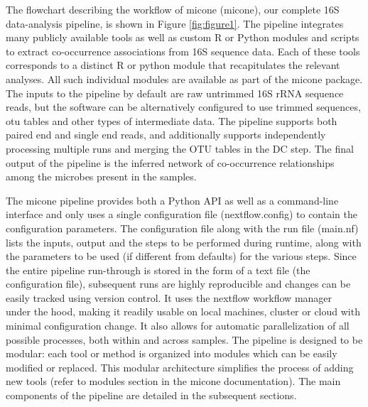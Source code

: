  \vspace{-5mm}
  The flowchart describing the workflow of \ac{micone} (\acl{micone}), our complete 16S data-analysis pipeline, is shown in Figure \ref{fig:figure1}.
  The pipeline integrates many publicly available tools as well as custom R or Python modules and scripts to extract co-occurrence associations from 16S sequence data.
  Each of these tools corresponds to a distinct R or python module that recapitulates the relevant analyses.
  All such individual modules are available as part of the \ac{micone} package.
  The inputs to the pipeline by default are raw untrimmed 16S rRNA sequence reads, but the software can be alternatively configured to use trimmed sequences, \ac{otu} tables and other types of intermediate data.
  The pipeline supports both paired end and single end reads, and additionally supports independently processing multiple runs and merging the OTU tables in the DC step.
  The final output of the pipeline is the inferred network of co-occurrence relationships among the microbes present in the samples.

  The \ac{micone} pipeline provides both a Python API as well as a command-line interface and only uses a single configuration file (nextflow.config) to contain the configuration parameters.
  The configuration file along with the run file (main.nf) lists the inputs, output and the steps to be performed during runtime, along with the parameters to be used (if different from defaults) for the various steps.
  Since the entire pipeline run-through is stored in the form of a text file (the configuration file), subsequent runs are highly reproducible and changes can be easily tracked using version control.
  It uses the nextflow workflow manager~\cite{Tommaso2015} under the hood, making it readily usable on local machines, cluster or cloud with minimal configuration change.
  It also allows for automatic parallelization of all possible processes, both within and across samples.
  The pipeline is designed to be modular: each tool or method is organized into modules which can be easily modified or replaced.
  This modular architecture simplifies the process of adding new tools (refer to modules section in the \ac{micone} documentation).
  The main components of the pipeline are detailed in the subsequent sections.

